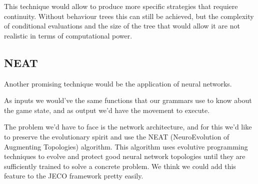 This technique would allow to produce more specific strategies that requiere continuity. Without behaviour trees this can still be achieved, but the complexity of conditional evaluations and the size of the tree that would allow it are not realistic in terms of computational power.


\subsection{NEAT}

Another promising technique would be the application of neural networks.

As inputs we would've the same functions that our grammars use to know about the game state, and as output we'd have the movement to execute.

The problem we'd have to face is the network architecture, and for this we'd like to preserve the evolutionary spirit and use the NEAT (NeuroEvolution of Augmenting Topologies) algorithm. This algorithm uses evolutive programming techniques to evolve and protect good neural network topologies until they are sufficiently trained to solve a concrete problem. We think we could add this feature to the JECO framework pretty easily.
